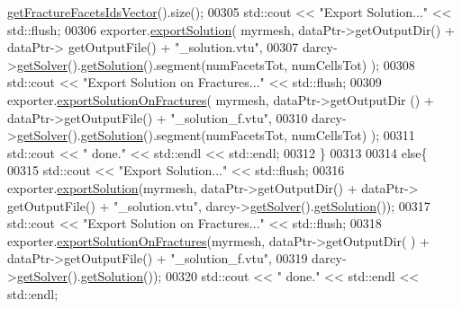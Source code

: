\begin{DoxyCode}
      \hyperlink{classFVCode3D_1_1Rigid__Mesh_aadbe6d9ad704122537903396d91238e0}{getFractureFacetsIdsVector}().size();
00305                 std::cout << \textcolor{stringliteral}{"Export Solution..."} << std::flush;
00306                 exporter.\hyperlink{classFVCode3D_1_1ExporterVTU_a476a1dd02bcba8c31f0d99c7106d0c21}{exportSolution}( myrmesh, dataPtr->getOutputDir() + dataPtr->
      getOutputFile() + \textcolor{stringliteral}{"\_solution.vtu"}, 
00307                         darcy->\hyperlink{classFVCode3D_1_1Problem_a39e64d24161ea699046d4e670fbc4eab}{getSolver}().\hyperlink{classFVCode3D_1_1Solver_a461d049e52ffc237cce3447c82860d3c}{getSolution}().segment(numFacetsTot,
      numCellsTot) );
00308                 std::cout << \textcolor{stringliteral}{"Export Solution on Fractures..."} << std::flush;
00309                 exporter.\hyperlink{classFVCode3D_1_1ExporterVTU_abc88a5113c02b55942862ef39b30ec80}{exportSolutionOnFractures}( myrmesh, dataPtr->getOutputDir
      () + dataPtr->getOutputFile() + \textcolor{stringliteral}{"\_solution\_f.vtu"}, 
00310                         darcy->\hyperlink{classFVCode3D_1_1Problem_a39e64d24161ea699046d4e670fbc4eab}{getSolver}().\hyperlink{classFVCode3D_1_1Solver_a461d049e52ffc237cce3447c82860d3c}{getSolution}().segment(numFacetsTot,
      numCellsTot) );
00311                 std::cout << \textcolor{stringliteral}{" done."} << std::endl << std::endl;
00312         \}
00313             
00314     \textcolor{keywordflow}{else}\{
00315                 std::cout << \textcolor{stringliteral}{"Export Solution..."} << std::flush;
00316                 exporter.\hyperlink{classFVCode3D_1_1ExporterVTU_a476a1dd02bcba8c31f0d99c7106d0c21}{exportSolution}(myrmesh, dataPtr->getOutputDir() + dataPtr->
      getOutputFile() + \textcolor{stringliteral}{"\_solution.vtu"}, darcy->\hyperlink{classFVCode3D_1_1Problem_a39e64d24161ea699046d4e670fbc4eab}{getSolver}().\hyperlink{classFVCode3D_1_1Solver_a461d049e52ffc237cce3447c82860d3c}{getSolution}());
00317                 std::cout << \textcolor{stringliteral}{"Export Solution on Fractures..."} << std::flush;
00318                 exporter.\hyperlink{classFVCode3D_1_1ExporterVTU_abc88a5113c02b55942862ef39b30ec80}{exportSolutionOnFractures}(myrmesh, dataPtr->getOutputDir(
      ) + dataPtr->getOutputFile() + \textcolor{stringliteral}{"\_solution\_f.vtu"},
00319         darcy->\hyperlink{classFVCode3D_1_1Problem_a39e64d24161ea699046d4e670fbc4eab}{getSolver}().\hyperlink{classFVCode3D_1_1Solver_a461d049e52ffc237cce3447c82860d3c}{getSolution}());
00320         std::cout << \textcolor{stringliteral}{" done."} << std::endl << std::endl;

\end{DoxyCode}
